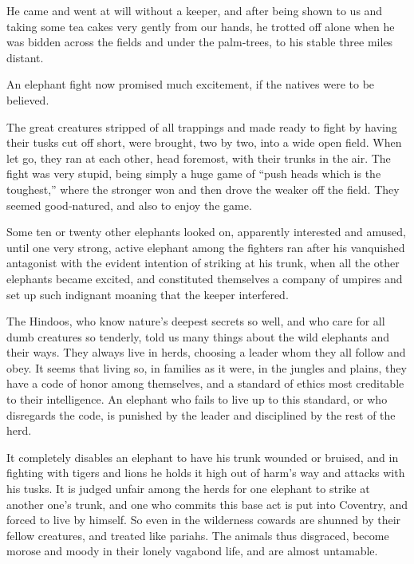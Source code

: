 \documentclass[12pt]{book}
\begin{document}
He came and went at will without a keeper, and after being shown to us and
taking some tea cakes very gently from our hands, he trotted off alone when he
was bidden across the fields and under the palm‐trees, to his stable three miles
distant.

An elephant fight now promised much excitement, if the natives were to be
believed.

The great creatures stripped of all trappings and made ready to fight by having
their tusks cut off short, were brought, two by two, into a wide open field. When
let go, they ran at each other, head foremost, with their trunks in the air. The fight
was very stupid, being simply a huge game of “push heads which is the toughest,”
where the stronger won and then drove the weaker off the field. They seemed
good‐natured, and also to enjoy the game.

Some ten or twenty other elephants looked on, apparently interested and
amused, until one very strong, active elephant among the fighters ran after his
vanquished antagonist with the evident intention of striking at his trunk, when
all the other elephants became excited, and constituted themselves a company of
umpires and set up such indignant moaning that the keeper interfered.

The Hindoos, who know nature’s deepest secrets so well, and who care for all
dumb creatures so tenderly, told us many things about the wild elephants and
their ways. They always live in herds, choosing a leader whom they all follow and
obey. It seems that living so, in families as it were, in the jungles and plains, they
have a code of honor among themselves, and a standard of ethics most creditable
to their intelligence. An elephant who fails to live up to this standard, or who
disregards the code, is punished by the leader and disciplined by the rest of the
herd.

It completely disables an elephant to have his trunk wounded or bruised, and
in fighting with tigers and lions he holds it high out of harm’s way and attacks
with his tusks. It is judged unfair among the herds for one elephant to strike at
another one’s trunk, and one who commits this base act is put into Coventry, and
forced to live by himself. So even in the wilderness cowards are shunned by their
fellow creatures, and treated like pariahs. The animals thus disgraced, become
morose and moody in their lonely vagabond life, and are almost untamable.
\end{document}
